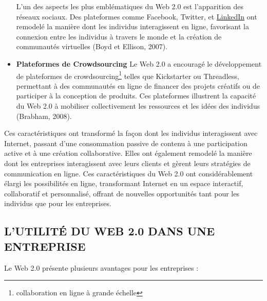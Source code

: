 \documentclass[12pt,a4paper]{article} %
\begin{document}
\begin{itemize}
		L'un des aspects les plus emblématiques du Web 2.0 est l'apparition des réseaux sociaux. Des plateformes comme Facebook, Twitter, et \href{https://fr.linkedin.com/}{LinkedIn} ont remodelé la manière dont les individus interagissent en ligne, favorisant la connexion entre les individus à travers le monde et la création de communautés virtuelles (Boyd et Ellison, 2007).
		\item \textbf{Plateformes de Crowdsourcing}
		Le Web 2.0 a encouragé le développement de plateformes de crowdsourcing\footnote[6]{collaboration en ligne à grande échelle} telles que Kickstarter ou Threadless, permettant à des communautés en ligne de financer des projets créatifs ou de participer à la conception de produits. Ces plateformes illustrent la capacité du Web 2.0 à mobiliser collectivement les ressources et les idées des individus (Brabham, 2008).
	\end{itemize}
	Ces caractéristiques ont transformé la façon dont les individus interagissent avec Internet, passant d'une consommation passive de contenu à une participation active et à une création collaborative. Elles ont également remodelé la manière dont les entreprises interagissent avec leurs clients et gèrent leurs stratégies de communication en ligne. Ces caractéristiques du Web 2.0 ont considérablement élargi les possibilités en ligne, transformant Internet en un espace interactif, collaboratif et personnalisé, offrant de nouvelles opportunités tant pour les individus que pour les entreprises.
	
	\subsection{\textbf{L’UTILITÉ DU WEB 2.0 DANS UNE ENTREPRISE
				}}
			
			Le Web 2.0 présente plusieurs avantages pour les entreprises :
			
\end{document}
